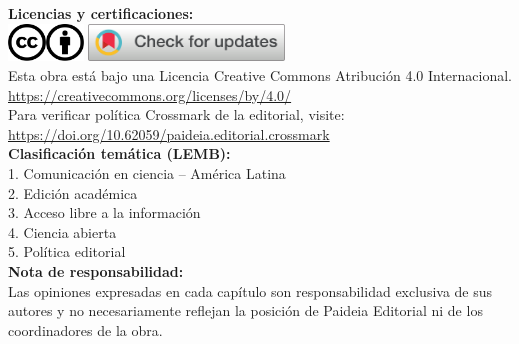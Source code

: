 \noindent\textbf{Licencias y certificaciones:}\\[0.5em]
\includegraphics[height=1cm]{cc.png}\hspace{0.2cm}\includegraphics[height=1cm]{by.png}\hspace{1cm}%
\href{https://crossmark.crossref.org/dialog/?doi=10.62059/editorial.l001&domain=pdf&date_stamp=2025-07-22}{\includegraphics[height=1cm]{crossmark-logo.png}}
\\[0.5em]
Esta obra está bajo una Licencia Creative Commons Atribución 4.0 Internacional.\\
\url{https://creativecommons.org/licenses/by/4.0/}\\
Para verificar política Crossmark de la editorial, visite: \url{https://doi.org/10.62059/paideia.editorial.crossmark}\\[1em]

\noindent\textbf{Clasificación temática (LEMB):}\\
1. Comunicación en ciencia -- América Latina\\
2. Edición académica\\
3. Acceso libre a la información\\
4. Ciencia abierta\\
5. Política editorial\\[1em]

\noindent\textbf{Nota de responsabilidad:}\\
Las opiniones expresadas en cada capítulo son responsabilidad exclusiva de sus autores y no necesariamente reflejan la posición de Paideia Editorial ni de los coordinadores de la obra.\\[1em]

\vspace*{\fill}

